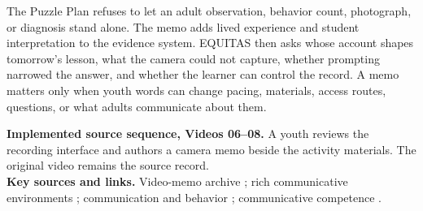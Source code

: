 
The Puzzle Plan refuses to let an adult observation, behavior count, photograph, or diagnosis stand alone. The memo adds lived experience and student interpretation to the evidence system. EQUITAS then asks whose account shapes tomorrow's lesson, what the camera could not capture, whether prompting narrowed the answer, and whether the learner can control the record. A memo matters only when youth words can change pacing, materials, access routes, questions, or what adults communicate about them.


\vspace{0.06in}
\noindent
{}%
\hfill
\begin{minipage}[c]{0.58\textwidth}
\scriptsize
\textbf{Implemented source sequence, Videos 06--08.} A youth reviews the recording interface and authors a camera memo beside the activity materials. The original video remains the source record.\\[0.025in]
\textbf{Key sources and links.} Video-memo archive \citep{campEvidence2026}; rich communicative environments \citep{downing2015classroom}; communication and behavior \citep{peckhamhardin2015behavior}; communicative competence \citep{jorgensen2018competence}.
\end{minipage}

\endinput